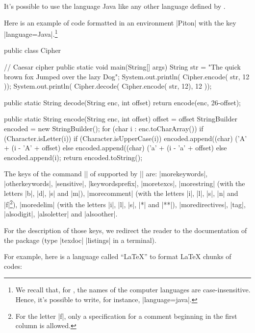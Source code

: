 \documentclass{article}
\begin{document}
\medskip
It's possible to use the language Java like any other language defined by
.

Here is an example of code formatted in an environment |{Piton}| with
the key |language=Java|.\footnote{We recall that, for , the names
of the computer languages are case-insensitive. Hence, it's possible to
write, for instance, |language=java|.}


\bigskip
\begingroup
\small
{}
\begin{Piton}[language = java]
public class Cipher {  // Caesar cipher
    public static void main(String[] args) {
        String str = "The quick brown fox Jumped over the lazy Dog";
        System.out.println( Cipher.encode( str, 12 ));
        System.out.println( Cipher.decode( Cipher.encode( str, 12), 12 ));
    }

    public static String decode(String enc, int offset) {
        return encode(enc, 26-offset);
    }

    public static String encode(String enc, int offset) {
        offset = offset %
        StringBuilder encoded = new StringBuilder();
        for (char i : enc.toCharArray()) {
            if (Character.isLetter(i)) {
                if (Character.isUpperCase(i)) {
                    encoded.append((char) ('A' + (i - 'A' + offset) %
                } else {
                    encoded.append((char) ('a' + (i - 'a' + offset) %
                }
            } else {
                encoded.append(i);
            }
        }
        return encoded.toString();
    }
}
\end{Piton}
\endgroup

\bigskip

The keys of the command |\lstdefinelanguage| of  supported by |\NewPitonLanguage| are:
|morekeywords|, |otherkeywords|, |sensitive|, |keywordsprefix|, |moretexcs|,
|morestring| (with the letters |b|,
|d|, |s| and |m|), |morecomment| (with the letters |i|, |l|, |s|, |n| and |f|\footnote{For the letter |f|, only a specification for a comment beginning in the first column is allowed.}),
|moredelim| (with the letters |i|,
|l|, |s|, |*| and |**|), |moredirectives|, |tag|, |alsodigit|, |alsoletter|
and |alsoother|.

For the description of those keys, we redirect the reader to the documentation
of the package  (type |texdoc| |listings| in a terminal). 

\bigskip
For example, here is a language called ``LaTeX'' to format LaTeX chunks of codes:
\end{document}
